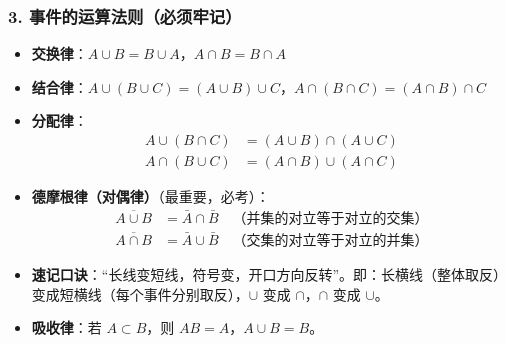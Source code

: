 \documentclass[12pt,a4paper]{ctexart}
\begin{document}
\subsubsection{3. 事件的运算法则（必须牢记）}
\begin{itemize}[noitemsep]
    \item \textbf{交换律}：$A\cup B = B\cup A$，$A\cap B = B\cap A$
    \item \textbf{结合律}：$A\cup (B\cup C) = (A\cup B)\cup C$，$A\cap (B\cap C) = (A\cap B)\cap C$
    \item \textbf{分配律}：
          \begin{align*}
              A\cup (B\cap C) & = (A\cup B)\cap (A\cup C) \\
              A\cap (B\cup C) & = (A\cap B)\cup (A\cap C)
          \end{align*}
    \item \textbf{德摩根律（对偶律）}（最重要，必考）：
          \begin{align*}
              \overline{A\cup B} & = \bar{A}\cap \bar{B} \quad \text{（并集的对立等于对立的交集）} \\
              \overline{A\cap B} & = \bar{A}\cup \bar{B} \quad \text{（交集的对立等于对立的并集）}
          \end{align*}
    \item \textbf{速记口诀}：“长线变短线，符号变，开口方向反转”。即：长横线（整体取反）变成短横线（每个事件分别取反），$\cup$ 变成 $\cap$，$\cap$ 变成 $\cup$。
    \item \textbf{吸收律}：若 $A\subset B$，则 $AB = A$，$A\cup B = B$。
\end{itemize}
\end{document}

